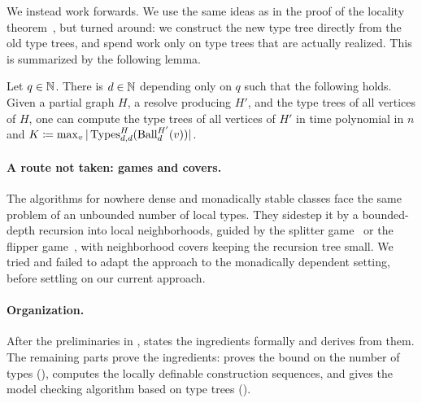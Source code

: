 We instead work forwards.
We use the same ideas as in the proof of the locality theorem~\cite{locality-note}, but turned around:
we construct the new type tree directly from the old type trees, and spend work only on type trees that are actually realized.
This is summarized by the following lemma.

\begin{lemma}\label{lem:ov-resolve-lift}
  Let $q\in\mathbb N$. There is $d\in\mathbb N$ depending only on $q$ such that the following holds.
  Given a partial graph $H$, a resolve producing $H'$, and the type trees of all vertices of $H$,
  one can compute the type trees of all vertices of $H'$ in time polynomial in $n$ and
  $K\coloneqq\max_{v}|\operatorname{Types}^H_{d,d}(\operatorname{Ball}^{H'}_d(v))|$.
\end{lemma}

\paragraph{A route not taken: games and covers.}
The algorithms for nowhere dense and monadically stable classes face the same problem of an unbounded number of local types.
They sidestep it by a bounded-depth recursion into local neighborhoods, guided by the splitter game~\cite{gks} or the flipper game~\cite{flippers,ms-mc1,ms-mc2}, with neighborhood covers keeping the recursion tree small.
We tried and failed to adapt the approach to the monadically dependent setting, before settling on our current approach.


\paragraph{Organization.}
After the preliminaries in ,  states the ingredients formally and derives  from them.
The remaining parts prove the ingredients:
 proves the bound on the number of types (),
 computes the locally definable construction sequences,
and  gives the model checking algorithm based on type trees ().
